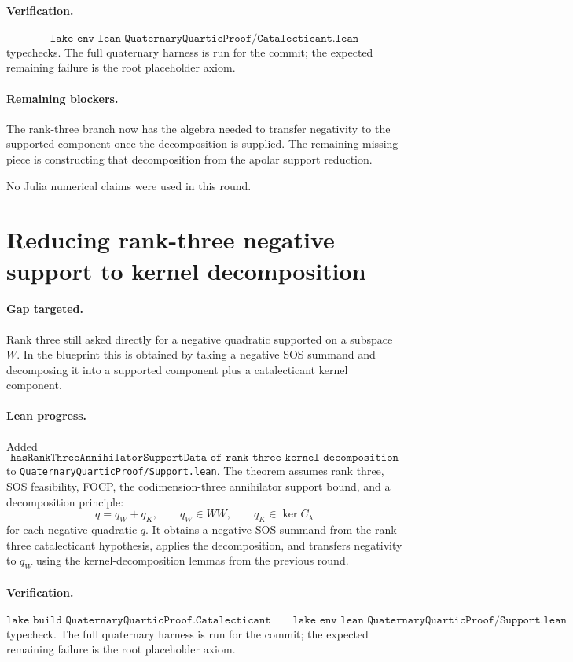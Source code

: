 \documentclass[11pt]{article}
\begin{document}
\paragraph{Verification.}
\[
\texttt{lake env lean QuaternaryQuarticProof/Catalecticant.lean}
\]
typechecks.  The full quaternary harness is run for the commit; the expected
remaining failure is the root placeholder axiom.

\paragraph{Remaining blockers.}
The rank-three branch now has the algebra needed to transfer negativity to the
supported component once the decomposition is supplied.  The remaining missing
piece is constructing that decomposition from the apolar support reduction.

No Julia numerical claims were used in this round.

\section*{Reducing rank-three negative support to kernel decomposition}

\paragraph{Gap targeted.}
Rank three still asked directly for a negative quadratic supported on a
subspace \(W\).  In the blueprint this is obtained by taking a negative SOS
summand and decomposing it into a supported component plus a catalecticant
kernel component.

\paragraph{Lean progress.}
Added
\[
\texttt{hasRankThreeAnnihilatorSupportData\_of\_rank\_three\_kernel\_decomposition}
\]
to \texttt{QuaternaryQuarticProof/Support.lean}.  The theorem assumes
rank three, SOS feasibility, FOCP, the codimension-three annihilator support
bound, and a decomposition principle:
\[
q=q_W+q_K,\qquad q_W\in WW,\qquad q_K\in\ker C_\lambda
\]
for each negative quadratic \(q\).  It obtains a negative SOS summand from the
rank-three catalecticant hypothesis, applies the decomposition, and transfers
negativity to \(q_W\) using the kernel-decomposition lemmas from the previous
round.

\paragraph{Verification.}
\[
\texttt{lake build QuaternaryQuarticProof.Catalecticant}
\qquad
\texttt{lake env lean QuaternaryQuarticProof/Support.lean}
\]
typecheck.  The full quaternary harness is run for the commit; the expected
remaining failure is the root placeholder axiom.
\end{document}
